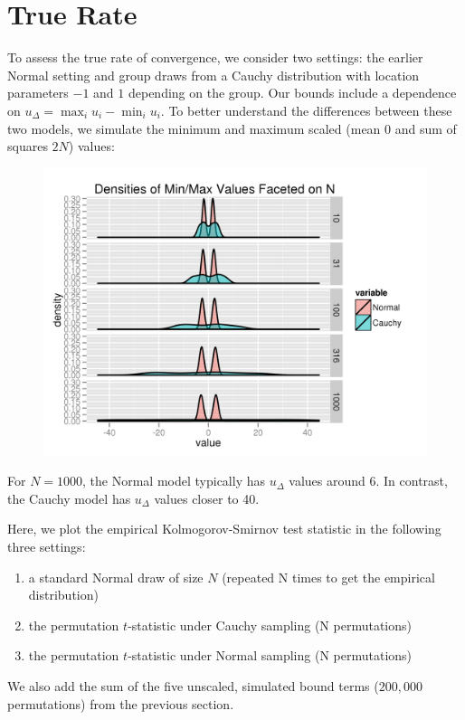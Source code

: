 \section{True Rate}
To assess the true rate of convergence, we consider two settings: the earlier Normal setting and
group draws from a Cauchy distribution with location parameters $-1$ and $1$ depending on the
group.  Our bounds include a dependence on $u_{\Delta} = \max_i u_{i} - \min_i u_{i}$.  To better
understand the differences between these two models, we simulate the minimum and maximum scaled
(mean $0$ and sum of squares $2N$) values:
\begin{figure}[!ht]
  \centering
  \includegraphics{./simulations/sim5.png}
\end{figure}

For $N=1000$, the Normal model typically has $u_{\Delta}$ values around 6.  In contrast, the Cauchy
model has $u_{\Delta}$ values closer to 40.  
\clearpage

Here, we plot the empirical Kolmogorov-Smirnov test statistic in the following three settings:
\begin{enumerate}
\item a standard Normal draw of size $N$ (repeated N times to get the empirical distribution)
\item the permutation $t$-statistic under Cauchy sampling (N permutations)
\item the permutation $t$-statistic under Normal sampling (N permutations)
\end{enumerate}
We also add the sum of the five unscaled, simulated bound terms ($200,000$ permutations) from the
previous section.

